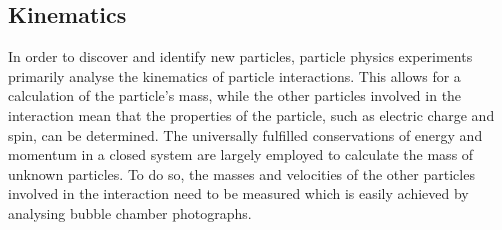 \documentclass[twocolumn]{article}
\begin{document}
\subsection{Kinematics}
In order to discover and identify new particles, particle physics experiments primarily analyse the kinematics of particle interactions. This allows for a calculation of the particle's mass, while the other particles involved in the interaction mean that the properties of the particle, such as electric charge and spin, can be determined. The universally fulfilled conservations of energy and momentum in a closed system are largely employed to calculate the mass of unknown particles. To do so, the masses and velocities of the other particles involved in the interaction need to be measured which is easily achieved by analysing bubble chamber photographs.

\end{document}
